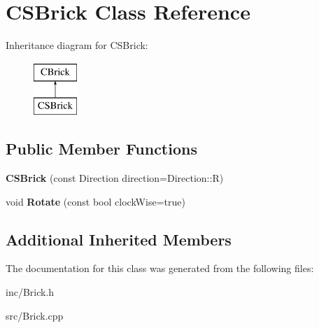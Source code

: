 \hypertarget{classCSBrick}{\section{C\-S\-Brick Class Reference}
\label{classCSBrick}
}
Inheritance diagram for C\-S\-Brick\-:\begin{figure}[H]
\begin{center}
\leavevmode
\includegraphics[height=2.000000cm]{classCSBrick}
\end{center}
\end{figure}
\subsection*{Public Member Functions}
\begin{DoxyCompactItemize}
\item 
\hypertarget{classCSBrick_a0abf72fc387548f5eee81c8cd10faedb}{{\bfseries C\-S\-Brick} (const Direction direction=Direction\-::\-R)}\label{classCSBrick_a0abf72fc387548f5eee81c8cd10faedb}

\item 
\hypertarget{classCSBrick_a0b3a43572caf4ee067b73aca65cc560f}{void {\bfseries Rotate} (const bool clock\-Wise=true)}\label{classCSBrick_a0b3a43572caf4ee067b73aca65cc560f}

\end{DoxyCompactItemize}
\subsection*{Additional Inherited Members}


The documentation for this class was generated from the following files\-:\begin{DoxyCompactItemize}
\item 
inc/Brick.\-h\item 
src/Brick.\-cpp\end{DoxyCompactItemize}
